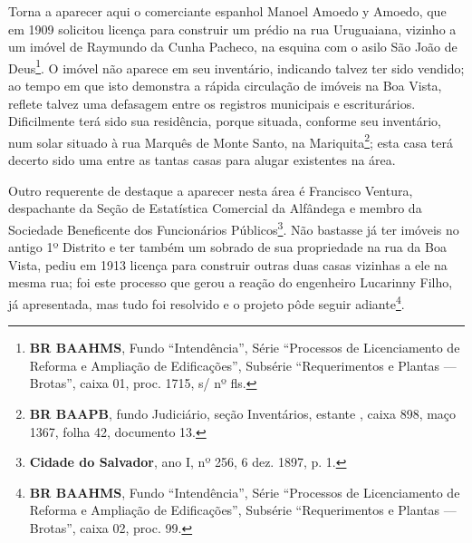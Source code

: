 Torna a aparecer aqui o comerciante espanhol Manoel Amoedo y Amoedo, que em 1909 solicitou licença para construir um prédio na rua Uruguaiana, vizinho a um imóvel de Raymundo da Cunha Pacheco, na esquina com o asilo São João de Deus\footnote{\textbf{BR BAAHMS}, Fundo ``Intendência'', Série ``Processos de Licenciamento de Reforma e Ampliação de Edificações'', Subsérie ``Requerimentos e Plantas --- Brotas'', caixa 01, proc. 1715, s/ nº fls.}. O imóvel não aparece em seu inventário, indicando talvez ter sido vendido; ao tempo em que isto demonstra a rápida circulação de imóveis na Boa Vista, reflete talvez uma defasagem entre os registros municipais e escriturários. Dificilmente terá sido sua residência, porque situada, conforme seu inventário, num solar situado à rua Marquês de Monte Santo, na Mariquita\footnote{\textbf{BR BAAPB}, fundo Judiciário, seção Inventários, estante , caixa 898, maço 1367, folha 42, documento 13.}; esta casa terá decerto sido uma entre as tantas casas para alugar existentes na área.

Outro requerente de destaque a aparecer nesta área é Francisco Ventura, despachante da Seção de Estatística Comercial da Alfândega \cite[p.~307]{reis_almanak_1898} e membro da Sociedade Beneficente dos Funcionários Públicos\footnote{\textbf{Cidade do Salvador}, ano I, nº 256, 6 dez. 1897, p. 1.}. Não bastasse já ter imóveis no antigo 1º Distrito e ter também um sobrado de sua propriedade na rua da Boa Vista, pediu em 1913 licença para construir outras duas casas vizinhas a ele na mesma rua; foi este processo que gerou a reação do engenheiro Lucarinny Filho, já apresentada, mas tudo foi resolvido e o projeto pôde seguir adiante\footnote{\textbf{BR BAAHMS}, Fundo ``Intendência'', Série ``Processos de Licenciamento de Reforma e Ampliação de Edificações'', Subsérie ``Requerimentos e Plantas --- Brotas'', caixa 02, proc. 99.}.

